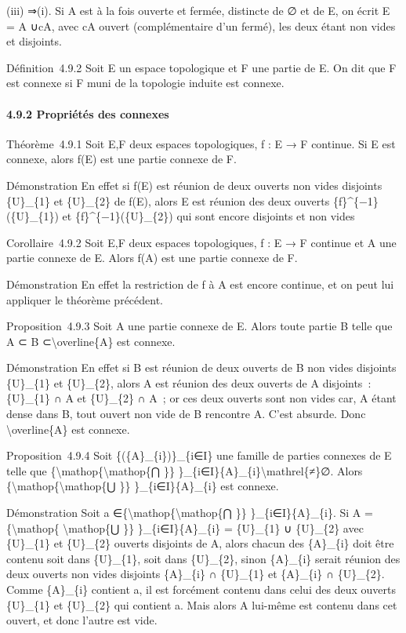 \documentclass[]{article}
\begin{document}
(iii) ⇒(i). Si A est à la fois ouverte et fermée, distincte de ∅ et de
E, on écrit E = A ∪cA, avec cA ouvert (complémentaire d'un fermé), les
deux étant non vides et disjoints.

Définition~4.9.2 Soit E un espace topologique et F une partie de E. On
dit que F est connexe si F muni de la topologie induite est connexe.

\paragraph{4.9.2 Propriétés des connexes}

Théorème~4.9.1 Soit E,F deux espaces topologiques, f : E → F continue.
Si E est connexe, alors f(E) est une partie connexe de F.

Démonstration En effet si f(E) est réunion de deux ouverts non vides
disjoints \{U\}\_\{1\} et \{U\}\_\{2\} de f(E), alors E est réunion des
deux ouverts \{f\}\^{}\{−1\}(\{U\}\_\{1\}) et
\{f\}\^{}\{−1\}(\{U\}\_\{2\}) qui sont encore disjoints et non vides

Corollaire~4.9.2 Soit E,F deux espaces topologiques, f : E → F continue
et A une partie connexe de E. Alors f(A) est une partie connexe de F.

Démonstration En effet la restriction de f à A est encore continue, et
on peut lui appliquer le théorème précédent.

Proposition~4.9.3 Soit A une partie connexe de E. Alors toute partie B
telle que A ⊂ B ⊂\textbackslash{}overline\{A\} est connexe.

Démonstration En effet si B est réunion de deux ouverts de B non vides
disjoints \{U\}\_\{1\} et \{U\}\_\{2\}, alors A est réunion des deux
ouverts de A disjoints~: \{U\}\_\{1\} ∩ A et \{U\}\_\{2\} ∩ A~; or ces
deux ouverts sont non vides car, A étant dense dans B, tout ouvert non
vide de B rencontre A. C'est absurde. Donc \textbackslash{}overline\{A\}
est connexe.

Proposition~4.9.4 Soit \{(\{A\}\_\{i\})\}\_\{i∈I\} une famille de
parties connexes de E telle que
\{\textbackslash{}mathop\{\textbackslash{}mathop\{⋂ \}\}
\}\_\{i∈I\}\{A\}\_\{i\}\textbackslash{}mathrel\{≠\}∅. Alors
\{\textbackslash{}mathop\{\textbackslash{}mathop\{⋃ \}\}
\}\_\{i∈I\}\{A\}\_\{i\} est connexe.

Démonstration Soit a
∈\{\textbackslash{}mathop\{\textbackslash{}mathop\{⋂ \}\}
\}\_\{i∈I\}\{A\}\_\{i\}. Si A =\{\textbackslash{}mathop\{
\textbackslash{}mathop\{⋃ \}\} \}\_\{i∈I\}\{A\}\_\{i\} = \{U\}\_\{1\} ∪
\{U\}\_\{2\} avec \{U\}\_\{1\} et \{U\}\_\{2\} ouverts disjoints de A,
alors chacun des \{A\}\_\{i\} doit être contenu soit dans \{U\}\_\{1\},
soit dans \{U\}\_\{2\}, sinon \{A\}\_\{i\} serait réunion des deux
ouverts non vides disjoints \{A\}\_\{i\} ∩ \{U\}\_\{1\} et \{A\}\_\{i\}
∩ \{U\}\_\{2\}. Comme \{A\}\_\{i\} contient a, il est forcément contenu
dans celui des deux ouverts \{U\}\_\{1\} et \{U\}\_\{2\} qui contient a.
Mais alors A lui-même est contenu dans cet ouvert, et donc l'autre est
vide.
\end{document}
